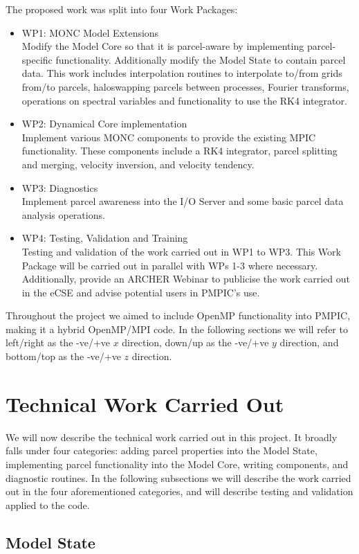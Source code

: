 \documentclass{article}
\begin{document}
The proposed work was split into four Work Packages:
\begin{itemize}
  \item WP1: MONC Model Extensions\\
  Modify the Model Core so that it is parcel-aware by implementing parcel-specific functionality. Additionally modify the Model State to contain parcel data. This work includes interpolation routines to interpolate to/from grids from/to parcels, haloswapping parcels between processes, Fourier transforms, operations on spectral variables and functionality to use the RK4 integrator.
  \item WP2: Dynamical Core implementation\\
  Implement various MONC components to provide the existing MPIC functionality. These components include a RK4 integrator, parcel splitting and merging, velocity inversion, and velocity tendency.
  \item WP3: Diagnostics\\
  Implement parcel awareness into the I/O Server and some basic parcel data analysis operations.
  \item WP4: Testing, Validation and Training\\
  Testing and validation of the work carried out in WP1 to WP3. This Work Package will be carried out in parallel with WPs 1-3 where necessary. Additionally, provide an ARCHER Webinar to publicise the work carried out in the eCSE and advise potential users in PMPIC's use.
\end{itemize}
Throughout the project we aimed to include OpenMP functionality into PMPIC, making it a hybrid OpenMP/MPI code.
In the following sections we will refer to left/right as the -ve/+ve $x$ direction, down/up as the -ve/+ve $y$ direction, and bottom/top as the -ve/+ve $z$ direction.

\section{Technical Work Carried Out} \label{development}
We will now describe the technical work carried out in this project. It broadly falls under four categories: adding parcel properties into the Model State, implementing parcel functionality into the Model Core, writing components, and diagnostic routines. In the following subsections we will describe the work carried out in the four aforementioned categories, and will describe testing and validation applied to the code.

\subsection{Model State}
\end{document}
